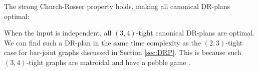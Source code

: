 

The strong Church-Rosser property holds, making all canonical DR-plans optimal:
%
\begin{remark}\label{rem:1dofcanon}
    When the input is independent, all $(3,4)$-tight canonical DR-plans are optimal. We can find such a DR-plan in the same time complexity as the $(2,3)$-tight case for bar-joint graphs discussed in Section \ref{sec:DRP}. This is because such $(3,4)$-tight graphs are matroidal and have a pebble game \cite{Lee:2007:PGA}.
\end{remark}


\ClearMyMinHeight
{}

